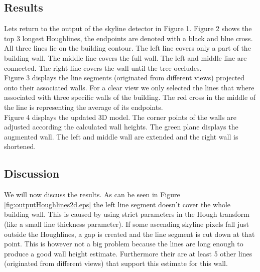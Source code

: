 \documentclass[10pt]{article}
\begin{document}
	

\subsection{Results}
\noindent
{}
Lets return to the output of the skyline detector in Figure 1.
Figure 2
shows the top 3 longest Houghlines, the
endpoints are denoted with a black and blue cross. All three lines lie on the
building contour.  The left line covers only a part of the building wall. The
middle line covers the full wall. The left and middle line are connected. The
right line covers the wall until the tree occludes.\\

Figure %
3 displays the line segments (originated from
different views) projected onto their associated walls.  For a clear view we
only selected the lines that where associated with three specific walls of the building.  
The red cross in the middle of the line is representing the average of its endpoints.\\

Figure 4 %
displays the updated 3D model. The
corner points of the walls are adjusted according the calculated wall heights.
The green plane displays the augmented wall. The left and middle wall are extended
and the right wall is shortened.\\


\subsection{Discussion}
We will now discuss the results. As can be seen in Figure
\ref{fig:outputHoughlines2d.eps} the left line segment doesn't cover the whole
building wall. This is caused by using strict parameters in the Hough transform
(like a small line thickness parameter).  If some ascending skyline pixels fall just outside
the Houghlines, a gap is created and the line segment is cut down at that point.
This is however not a big problem because the lines are long enough to produce a
good wall height estimate. Furthermore their are at least 5 other lines
(originated from different views) that
support this estimate for this wall.\\
\end{document}
